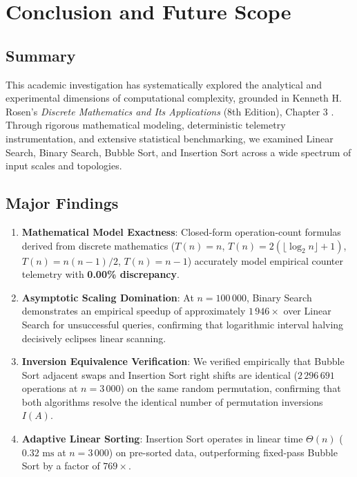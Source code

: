 \chapter{Conclusion and Future Scope}
\label{chap:conclusion}

\section{Summary}
This academic investigation has systematically explored the analytical and experimental dimensions of computational complexity, grounded in Kenneth H. Rosen's \emph{Discrete Mathematics and Its Applications} (8th Edition), Chapter 3 \cite{rosen2019discrete}. Through rigorous mathematical modeling, deterministic telemetry instrumentation, and extensive statistical benchmarking, we examined Linear Search, Binary Search, Bubble Sort, and Insertion Sort across a wide spectrum of input scales and topologies.

\section{Major Findings}
\begin{enumerate}
    \item \textbf{Mathematical Model Exactness}: Closed-form operation-count formulas derived from discrete mathematics ($T(n) = n$, $T(n) = 2(\lfloor \log_2 n \rfloor + 1)$, $T(n) = n(n-1)/2$, $T(n) = n - 1$) accurately model empirical counter telemetry with \textbf{0.00\% discrepancy}.
    \item \textbf{Asymptotic Scaling Domination}: At $n = 100\,000$, Binary Search demonstrates an empirical speedup of approximately \textbf{$1\,946\times$} over Linear Search for unsuccessful queries, confirming that logarithmic interval halving decisively eclipses linear scanning.
    \item \textbf{Inversion Equivalence Verification}: We verified empirically that Bubble Sort adjacent swaps and Insertion Sort right shifts are identical ($2\,296\,691$ operations at $n = 3\,000$) on the same random permutation, confirming that both algorithms resolve the identical number of permutation inversions $I(A)$.
    \item \textbf{Adaptive Linear Sorting}: Insertion Sort operates in linear time $\Theta(n)$ ($0.32\text{ ms}$ at $n = 3\,000$) on pre-sorted data, outperforming fixed-pass Bubble Sort by a factor of \textbf{$769\times$}.
\end{enumerate}

